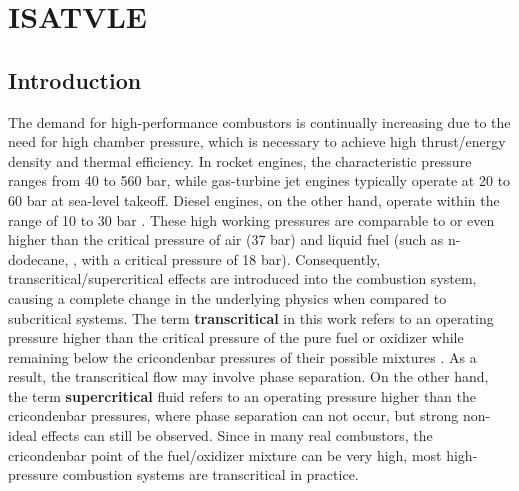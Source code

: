 \chapter{ISATVLE}
\label{ISATVLE_chapter}
\section{Introduction}
The demand for high-performance combustors is continually increasing due to the need for high chamber pressure, which is necessary to achieve high thrust/energy density and thermal efficiency. In rocket engines, the characteristic pressure ranges from 40 to 560 bar, while gas-turbine jet engines typically operate at 20 to 60 bar at sea-level takeoff. Diesel engines, on the other hand, operate within the range of 10 to 30 bar \cite{jofre2021transcritical}. These high working pressures are comparable to or even higher than the critical pressure of air (37 bar) and liquid fuel (such as n-dodecane, , with a critical pressure of 18 bar). Consequently, transcritical/supercritical effects are introduced into the combustion system, causing a complete change in the underlying physics when compared to subcritical systems. The term \textbf{transcritical} in this work refers to an operating pressure higher than the critical pressure of the pure fuel or oxidizer while remaining below the cricondenbar pressures of their possible mixtures \cite{fathi2022large}. As a result, the transcritical flow may involve phase separation. On the other hand, the term \textbf{supercritical} fluid refers to an operating pressure higher than the cricondenbar pressures, where phase separation can not occur, but strong non-ideal effects can still be observed. Since in many real combustors, the cricondenbar point of the fuel/oxidizer mixture can be very high, most high-pressure combustion systems are transcritical in practice.  

